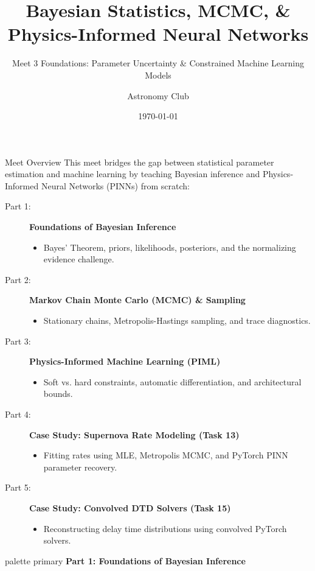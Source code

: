 \documentclass[9pt]{beamer}
\title{Bayesian Statistics, MCMC, \& Physics-Informed Neural Networks}
\subtitle{Meet 3 Foundations: Parameter Uncertainty \& Constrained Machine Learning Models}
\author{Astronomy Club}
\date{\today}
\begin{document}
\maketitle

\begin{frame}{Meet Overview}
  This meet bridges the gap between statistical parameter estimation and machine learning by teaching Bayesian inference and Physics-Informed Neural Networks (PINNs) from scratch:
  \begin{description}
    \item[Part 1:] \textbf{Foundations of Bayesian Inference}
      \begin{itemize}
        \item Bayes' Theorem, priors, likelihoods, posteriors, and the normalizing evidence challenge.
      \end{itemize}
    \item[Part 2:] \textbf{Markov Chain Monte Carlo (MCMC) \& Sampling}
      \begin{itemize}
        \item Stationary chains, Metropolis-Hastings sampling, and trace diagnostics.
      \end{itemize}
    \item[Part 3:] \textbf{Physics-Informed Machine Learning (PIML)}
      \begin{itemize}
        \item Soft vs. hard constraints, automatic differentiation, and architectural bounds.
      \end{itemize}
    \item[Part 4:] \textbf{Case Study: Supernova Rate Modeling (Task 13)}
      \begin{itemize}
        \item Fitting rates using MLE, Metropolis MCMC, and PyTorch PINN parameter recovery.
      \end{itemize}
    \item[Part 5:] \textbf{Case Study: Convolved DTD Solvers (Task 15)}
      \begin{itemize}
        \item Reconstructing delay time distributions using convolved PyTorch solvers.
      \end{itemize}
  \end{description}
\end{frame}

\begin{frame}[plain]
  \vfill
  \centering
  \begin{beamercolorbox}[sep=8pt,center,shadow=true,rounded=true]{palette primary}
    \textbf{Part 1: Foundations of Bayesian Inference}
  \end{beamercolorbox}
  \vfill
\end{frame}
\end{document}
